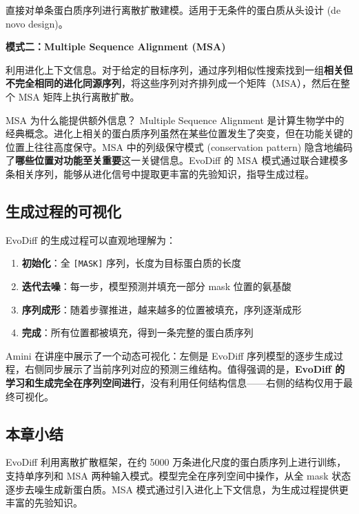 \documentclass[a4paper]{article}
\begin{document}
直接对单条蛋白质序列进行离散扩散建模。适用于无条件的蛋白质从头设计 (de novo design)。

\textbf{模式二：Multiple Sequence Alignment (MSA)}

利用进化上下文信息。对于给定的目标序列，通过序列相似性搜索找到一组\textbf{相关但不完全相同的进化同源序列}，将这些序列对齐排列成一个矩阵（MSA），然后在整个 MSA 矩阵上执行离散扩散。

\begin{knowledgebox}{MSA 为什么能提供额外信息？}
Multiple Sequence Alignment 是计算生物学中的经典概念。进化上相关的蛋白质序列虽然在某些位置发生了突变，但在功能关键的位置上往往高度保守。MSA 中的列级保守模式 (conservation pattern) 隐含地编码了\textbf{哪些位置对功能至关重要}这一关键信息。EvoDiff 的 MSA 模式通过联合建模多条相关序列，能够从进化信号中提取更丰富的先验知识，指导生成过程。
\end{knowledgebox}

\subsection{生成过程的可视化}

EvoDiff 的生成过程可以直观地理解为：

\begin{enumerate}
    \item \textbf{初始化}：全 \texttt{[MASK]} 序列，长度为目标蛋白质的长度
    \item \textbf{迭代去噪}：每一步，模型预测并填充一部分 mask 位置的氨基酸
    \item \textbf{序列成形}：随着步骤推进，越来越多的位置被填充，序列逐渐成形
    \item \textbf{完成}：所有位置都被填充，得到一条完整的蛋白质序列
\end{enumerate}

Amini 在讲座中展示了一个动态可视化：左侧是 EvoDiff 序列模型的逐步生成过程，右侧同步展示了当前序列对应的预测三维结构。值得强调的是，\textbf{EvoDiff 的学习和生成完全在序列空间进行}，没有利用任何结构信息——右侧的结构仅用于最终可视化。

\subsection{本章小结}

EvoDiff 利用离散扩散框架，在约 5000 万条进化尺度的蛋白质序列上进行训练，支持单序列和 MSA 两种输入模式。模型完全在序列空间中操作，从全 mask 状态逐步去噪生成新蛋白质。MSA 模式通过引入进化上下文信息，为生成过程提供更丰富的先验知识。
\end{document}
